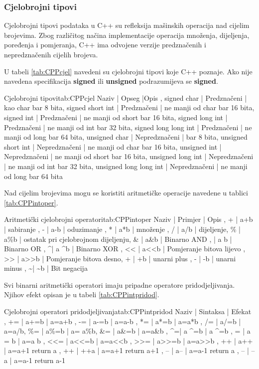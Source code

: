 \documentclass[11pt]{book}
\begin{document}
\subsubsection{Cjelobrojni tipovi}
Cjelobrojni tipovi podataka u C++ su refleksija mašinskih operacija nad cijelim brojevima. Zbog različitog načina implementacije operacija množenja, dijeljenja, poređenja i pomjeranja, C++ ima odvojene verzije predznačenih i nepredznačenih cijelih brojeva.

U tabeli \ref {tab:CPPcjel} navedeni su cjelobrojni tipovi koje C++ poznaje. Ako nije navedena specifikacija \textbf{signed} ili  \textbf{unsigned} podrazumijeva se  \textbf{signed}.

 {Cjelobrojni tipovi}{tab:CPPcjel}
{  Naziv  | Opseg |Opis ,
  signed char | Predznačeni | kao char  bar 8 bita,
  signed short int | Predznačeni | ne manji od char bar 16 bita,
  signed int  | Predznačeni | ne manji od short bar 16 bita,
  signed long int  | Predznačeni | ne manji od int bar 32 bita,
  signed long long int  | Predznačeni | ne manji od long bar 64 bita,
  unsigned char | Nepredznačeni | bar 8 bita,
  unsigned short int | Nepredznačeni | ne manji od char bar 16 bita,
  unsigned int  | Nepredznačeni | ne manji od short bar 16 bita,
  unsigned long int  | Nepredznačeni | ne manji od int bar 32 bita,
  unsigned long long int  | Nepredznačeni | ne manji od long bar 64 bita
}

Nad cijelim brojevima mogu se koristiti aritmetičke operacije navedene u tablici \ref{tab:CPPintoper}.

 {Aritmetički  cjelobrojni operatori}{tab:CPPintoper}
{
  Naziv | Primjer  | Opis ,
  + | a+b | sabiranje ,
  - | a-b | oduzimanje ,
  * | a*b | množenje ,
  / |  a/b | dijeljenje,
  \% |  a\%b |  ostatak pri cjelobrojnom dijeljenju,
  \& | a\&b | Binarno AND ,
  \vbr | a  \vbr b | Binarno OR ,
  \textasciicircum | a \textasciicircum b |  Binarno XOR ,
  <{}< | a<{}<b | Pomjeranje bitova lijevo ,
  >{}> |  a>{}>b | Pomjeranje bitova desno,
  + | +b | unarni plus ,
  - | -b | unarni minus ,
  \textasciitilde | \textasciitilde b | Bit negacija
}

Svi binarni aritmetički operatori imaju pripadne operatore pridodjeljivanja. Njihov efekt opisan je u tabeli \ref {tab:CPPintpridod}.

 {Cjelobrojni operatori pridodjeljivanja}{tab:CPPintpridod}
{
  Naziv | Sintaksa  | Efekat ,
  +=    | a+=b      | a=a+b ,
  -=    | a-=b      | a=a-b ,
  *=    | a*=b      | a=a*b ,
  /=    |  a/=b     | a=a/b,
  \%=   |  a\%=b    | a= a\%b,
  \&=   | a\&=b     |  a=a\&b ,
  \textasciicircum =| a \textasciicircum =b | a \textasciicircum =b  ,
  \vbr= | a \vbr= b | a=a \vbr b ,
  <{}<= | a<{}<=b   | a=a<{}<b  ,
  >{}>= | a>{}>=b   | a=a>{}>b  ,
  ++    |  a++      | a=a+1 return a ,
  ++    |  ++a      | a=a+1 return a+1 ,
  --    |  a--      | a=a-1 return a ,
  --    |  --a      | a=a-1 return a-1
}
\end{document}

